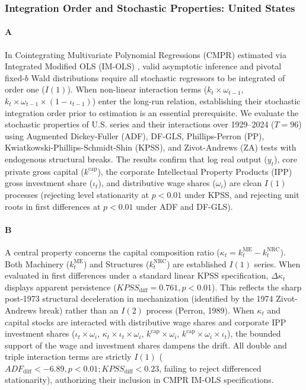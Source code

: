 \subsubsection{Integration Order and Stochastic Properties: United States}
\label{sec:43:integration_order_us}

\paragraph{A}
In Cointegrating Multivariate Polynomial Regressions (CMPR) estimated via Integrated Modified OLS (IM-OLS) \citep{VogelsangWagner2014,VogelsangWagner2024}, valid asymptotic inference and pivotal fixed-$b$ Wald distributions require all stochastic regressors to be integrated of order one ($I(1)$). When non-linear interaction terms ($k_t \times \omega_{t-1}$, $k_t \times \omega_{t-1} \times (1-\iota_{t-1})$) enter the long-run relation, establishing their stochastic integration order prior to estimation is an essential prerequisite. We evaluate the stochastic properties of U.S. series and their interactions over 1929--2024 ($T = 96$) using Augmented Dickey-Fuller (ADF), DF-GLS, Phillips-Perron (PP), Kwiatkowski-Phillips-Schmidt-Shin (KPSS), and Zivot-Andrews (ZA) tests with endogenous structural breaks. The results confirm that log real output ($y_t$), core private gross capital ($k^{\text{cap}}$), the corporate Intellectual Property Products (IPP) gross investment share ($\iota_t$), and distributive wage shares ($\omega_i$) are clean $I(1)$ processes (rejecting level stationarity at $p < 0.01$ under KPSS, and rejecting unit roots in first differences at $p < 0.01$ under ADF and DF-GLS).

\paragraph{B}
A central property concerns the capital composition ratio ($\kappa_t = k^{\text{ME}}_t - k^{\text{NRC}}_t$). Both Machinery ($k^{\text{ME}}_t$) and Structures ($k^{\text{NRC}}_t$) are established $I(1)$ series. When evaluated in first differences under a standard linear KPSS specification, $\Delta \kappa_t$ displays apparent persistence ($KPSS_{\text{diff}} = 0.761, p < 0.01$). This reflects the sharp post-1973 structural deceleration in mechanization (identified by the 1974 Zivot-Andrews break) rather than an $I(2)$ process (Perron, 1989). When $\kappa_t$ and capital stocks are interacted with distributive wage shares and corporate IPP investment shares ($\iota_t \times \omega_i$, $\kappa_t \times \iota_t \times \omega_i$, $k^{\text{cap}} \times \omega_i$, $k^{\text{cap}} \times \omega_i \times \iota_t$), the bounded support of the wage and investment shares dampens the drift. All double and triple interaction terms are strictly $I(1)$ ($ADF_{\text{diff}} < -6.89, p < 0.01; KPSS_{\text{diff}} < 0.23$, failing to reject differenced stationarity), authorizing their inclusion in CMPR IM-OLS specifications.

